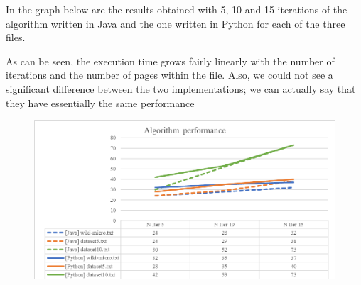 In the graph below are the results obtained with 5, 10 and 15 iterations of the algorithm written in Java and the one written in Python for each of the three files.


\noindent As can be seen, the execution time grows fairly linearly with the number of iterations and the number of pages within the file. Also, we could not see a significant difference between the two implementations; we can actually say that they have essentially the same performance

\begin{figure}[H]
	\includegraphics[width=\textwidth]{img/result.png}
	\label{fig:result}     
\end{figure}
